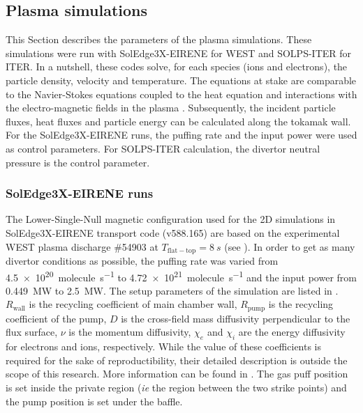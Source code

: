 \subsection{Plasma simulations}
This Section describes the parameters of the plasma simulations.
These simulations were run with SolEdge3X-EIRENE for WEST and SOLPS-ITER for ITER.
In a nutshell, these codes solve, for each species (ions and electrons), the particle density, velocity and temperature.
The equations at stake are comparable to the Navier-Stokes equations coupled to the heat equation and interactions with the electro-magnetic fields in the plasma .
Subsequently, the incident particle fluxes, heat fluxes and particle energy can be calculated along the tokamak wall.
For the SolEdge3X-EIRENE runs, the puffing rate and the input power were used as control parameters.
For SOLPS-ITER calculation, the divertor neutral pressure is the control parameter.

\subsubsection{SolEdge3X-EIRENE runs}
The Lower-Single-Null magnetic configuration used for the 2D simulations in SolEdge3X-EIRENE transport code (v588.165) are based on the experimental WEST plasma discharge \#54903 at $T_\mathrm{flat-top} = \SI{8}{s}$ (see ).
In order to get as many divertor conditions as possible, the puffing rate was varied from \SI{4.5e20}{molecule.s^{-1}} to \SI{4.72e21}{molecule.s^{-1}} and the input power from \SI{0.449}{MW} to \SI{2.5}{MW}.
The setup parameters of the simulation are listed in .
$R_\mathrm{wall}$ is the recycling coefficient of main chamber wall, $R_\mathrm{pump}$ is the recycling coefficient of the pump, $D$ is the cross-field mass diffusivity perpendicular to the flux surface, $\nu$ is the momentum diffusivity, $\chi_e$ and $\chi_i$ are the energy diffusivity for electrons and ions, respectively.
While the value of these coefficients is required for the sake of reproductibility, their detailed description is outside the scope of this research.
More information can be found in .
The gas puff position is set inside the private region (\textit{ie} the region between the two strike points) and the pump position is set under the baffle.

